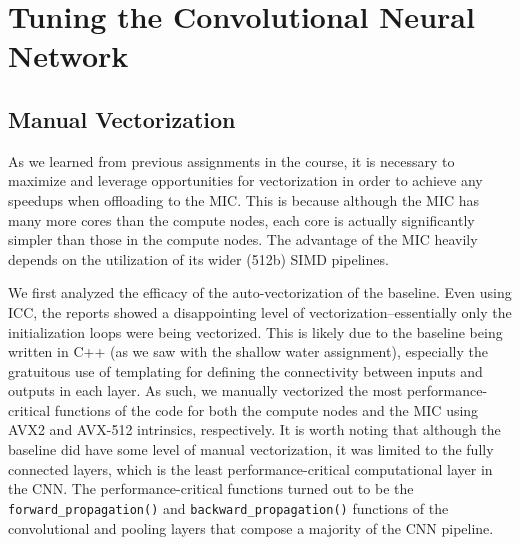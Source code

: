 
\section{Tuning the Convolutional Neural Network}
\label{sec-tuning}

\subsection{Manual Vectorization}
\label{sec-tuning-vectorization}




As we learned from previous assignments in the course, it is necessary to
maximize and leverage opportunities for vectorization in order to achieve
any speedups when offloading to the MIC. This is because although the MIC
has many more cores than the compute nodes, each core is actually
significantly simpler than those in the compute nodes. The advantage of
the MIC heavily depends on the utilization of its wider (512b) SIMD
pipelines.

We first analyzed the efficacy of the auto-vectorization of the
baseline. Even using ICC, the reports showed a disappointing level of
vectorization--essentially only the initialization loops were being
vectorized. This is likely due to the baseline being written in C++ (as
we saw with the shallow water assignment), especially the gratuitous use
of templating for defining the connectivity between inputs and outputs in
each layer. As such, we manually vectorized the most performance-critical
functions of the code for both the compute nodes and the MIC using AVX2
and AVX-512 intrinsics, respectively. It is worth noting that although
the baseline did have some level of manual vectorization, it was limited
to the fully connected layers, which is the least performance-critical
computational layer in the CNN. The performance-critical functions turned
out to be the \texttt{forward\_propagation()} and
\texttt{backward\_propagation()} functions of the convolutional and
pooling layers that compose a majority of the CNN pipeline.

